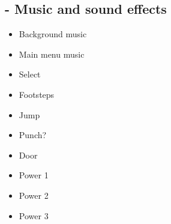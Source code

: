 \subsection{- Music and sound effects}
\begin{itemize}  
\item Background music
\item Main menu music
\item Select 
\item Footsteps
\item Jump
\item Punch?
\item Door
\item Power 1
\item Power 2
\item Power 3
\end{itemize}
